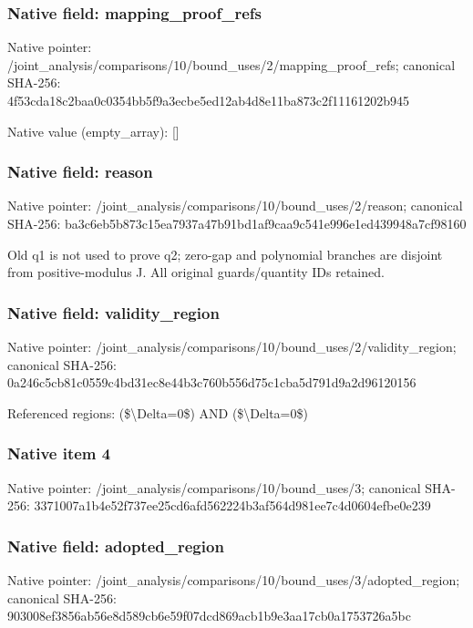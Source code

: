 \documentclass[10pt,a4paper]{article}
\begin{document}
\subsubsection{Native field: mapping\_\allowbreak{}proof\_\allowbreak{}refs}
Native pointer: /joint\_\allowbreak{}analysis/comparisons/10/bound\_\allowbreak{}uses/2/mapping\_\allowbreak{}proof\_\allowbreak{}refs; canonical SHA-256: 4f53cda18c2baa0c0354bb5f9a3ecbe5ed12ab4d8e11ba873c2f11161202b945

Native value (empty\_\allowbreak{}array): []

\subsubsection{Native field: reason}
Native pointer: /joint\_\allowbreak{}analysis/comparisons/10/bound\_\allowbreak{}uses/2/reason; canonical SHA-256: ba3c6eb5b873c15ea7937a47b91bd1af9caa9c541e996e1ed439948a7cf98160

\begingroup\raggedright\sloppy Old q1 is not used to prove q2;\allowbreak{} zero-gap and polynomial branches are disjoint from positive-modulus J. All original guards/\allowbreak{}quantity IDs retained.\par\endgroup

\subsubsection{Native field: validity\_\allowbreak{}region}
Native pointer: /joint\_\allowbreak{}analysis/comparisons/10/bound\_\allowbreak{}uses/2/validity\_\allowbreak{}region; canonical SHA-256: 0a246c5cb81c0559c4bd31ec8e44b3c760b556d75c1cba5d791d9a2d96120156

\begingroup\raggedright\sloppy Referenced regions:\allowbreak{} (\$\textbackslash{}Delta=\allowbreak{}0\$) AND (\$\textbackslash{}Delta=\allowbreak{}0\$)\par\endgroup

\subsubsection{Native item 4}
Native pointer: /joint\_\allowbreak{}analysis/comparisons/10/bound\_\allowbreak{}uses/3; canonical SHA-256: 3371007a1b4e52f737ee25cd6afd562224b3af564d981ee7c4d0604efbe0e239

\subsubsection{Native field: adopted\_\allowbreak{}region}
Native pointer: /joint\_\allowbreak{}analysis/comparisons/10/bound\_\allowbreak{}uses/3/adopted\_\allowbreak{}region; canonical SHA-256: 903008ef3856ab56e8d589cb6e59f07dcd869acb1b9e3aa17cb0a1753726a5bc
\end{document}
